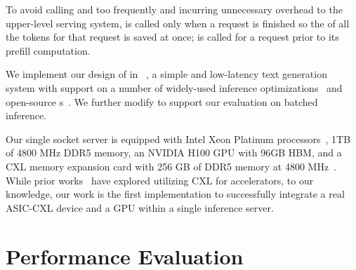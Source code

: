 To avoid calling \apisave and \apiload too frequently and incurring unnecessary overhead to the upper-level serving system, \apisave is called only when a request is finished so the \kvcache of all the tokens for that request is saved at once; \apiload is called for a request prior to its prefill computation. 

We implement our design of \tool in \gptfast~\cite{gpt-fast}, a simple and low-latency text generation system with support on a number of widely-used inference optimizations~\cite{leviathan2023fast,narayanan2021efficient,jacob2018quantization} and open-source \llm{}s~\cite{llama2,jiang2023mistral}. 
We further modify \gptfast to support our evaluation on batched inference.

Our single socket server is equipped with Intel Xeon Platinum processors~\cite{intelplatinum}, 1TB of 4800 MHz DDR5 memory, an NVIDIA H100 GPU with 96GB HBM, and a CXL memory expansion card with 256 GB of DDR5 memory at 4800 MHz~\cite{cxl2}. 
While prior works~\cite{cxlgpu1, cxlgpu2, cxlgpu3} have explored utilizing CXL for accelerators, to our knowledge, our work is the first implementation to successfully integrate a real ASIC-CXL device and a GPU within a single inference server.

\section{Performance Evaluation}
\label{sec:eval}

